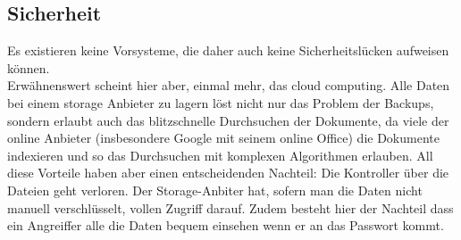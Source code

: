\documentclass[10pt,paper=a4,final]{scrartcl}
\begin{document}
\subsection{Sicherheit}
Es existieren keine Vorsysteme, die daher auch keine Sicherheitsl\"ucken aufweisen k\"onnen. \\
Erw\"ahnenswert scheint hier aber, einmal mehr, das cloud computing. Alle Daten bei einem storage Anbieter zu lagern löst nicht nur das Problem der Backups, sondern erlaubt auch das blitzschnelle Durchsuchen der Dokumente, da viele der online Anbieter (insbesondere Google mit seinem online Office) die Dokumente indexieren und so das Durchsuchen mit komplexen Algorithmen erlauben. All diese Vorteile haben aber einen entscheidenden Nachteil: Die Kontroller \"uber die Dateien geht verloren. Der Storage-Anbiter hat, sofern man die Daten nicht manuell verschl\"usselt, vollen Zugriff darauf. Zudem besteht hier der Nachteil dass ein Angreiffer alle die Daten bequem einsehen wenn er an das Passwort kommt.
\end{document}
